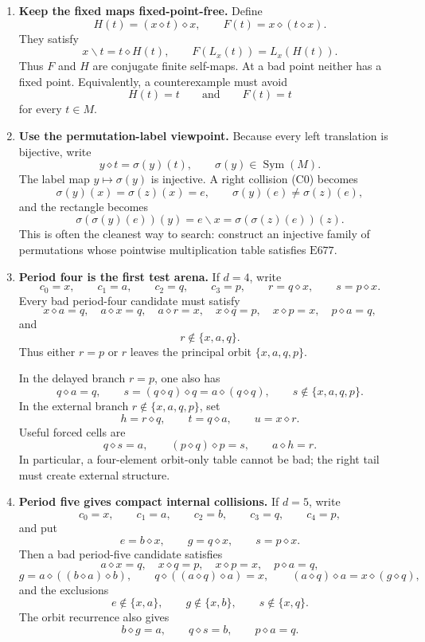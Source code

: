 \documentclass[12pt]{article}
\newcommand{\op}{\diamond}
\newcommand{\E}[1]{\mathrm{E#1}}
\theoremstyle{definition}
\begin{document}
\begin{enumerate}[label=\textbf{\arabic*.}]
\item \textbf{Keep the fixed maps fixed-point-free.}
Define
\[
H(t)=(x\op t)\op x,
\qquad
F(t)=x\op(t\op x).
\]
They satisfy
\[
x\backslash t=t\op H(t),
\qquad
F(L_x(t))=L_x(H(t)). \tag{F}
\]
Thus $F$ and $H$ are conjugate finite self-maps.  At a bad point neither has a fixed
point.  Equivalently, a counterexample must avoid
\[
H(t)=t
\qquad\text{and}\qquad
F(t)=t
\]
for every $t\in M$.

\item \textbf{Use the permutation-label viewpoint.}
Because every left translation is bijective, write
\[
y\op t=\sigma(y)(t),
\qquad
\sigma(y)\in\operatorname{Sym}(M).
\]
The label map $y\mapsto\sigma(y)$ is injective.  A right collision (C0) becomes
\[
\sigma(y)(x)=\sigma(z)(x)=e,
\qquad
\sigma(y)(e)\ne\sigma(z)(e),
\]
and the rectangle becomes
\[
\sigma(\sigma(y)(e))(y)=e\backslash x
=\sigma(\sigma(z)(e))(z). \tag{P}
\]
This is often the cleanest way to search: construct an injective family of permutations
whose pointwise multiplication table satisfies $\E{677}$.

\item \textbf{Period four is the first test arena.}
If $d=4$, write
\[
c_0=x,
\qquad
c_1=a,
\qquad
c_2=q,
\qquad
c_3=p,
\qquad
r=q\op x,
\qquad
s=p\op x.
\]
Every bad period-four candidate must satisfy
\[
x\op a=q,
\quad
a\op x=q,
\quad
a\op r=x,
\quad
x\op q=p,
\quad
x\op p=x,
\quad
p\op a=q, \tag{P4}
\]
and
\[
r\notin\{x,a,q\}. \tag{P4a}
\]
Thus either $r=p$ or $r$ leaves the principal orbit $\{x,a,q,p\}$.

In the delayed branch $r=p$, one also has
\[
q\op a=q,
\qquad
s=(q\op q)\op q=a\op(q\op q),
\qquad
s\notin\{x,a,q,p\}. \tag{P4b}
\]
In the external branch $r\notin\{x,a,q,p\}$, set
\[
h=r\op q,
\qquad
t=q\op a,
\qquad
u=x\op r.
\]
Useful forced cells are
\[
q\op s=a,
\qquad
(p\op q)\op p=s,
\qquad
a\op h=r. \tag{P4c}
\]
In particular, a four-element orbit-only table cannot be bad; the right tail must create
external structure.

\item \textbf{Period five gives compact internal collisions.}
If $d=5$, write
\[
c_0=x,
\qquad
c_1=a,
\qquad
c_2=b,
\qquad
c_3=q,
\qquad
c_4=p,
\]
and put
\[
e=b\op x,
\qquad
g=q\op x,
\qquad
s=p\op x.
\]
Then a bad period-five candidate satisfies
\[
a\op x=q,
\quad
x\op q=p,
\quad
x\op p=x,
\quad
p\op a=q, \tag{P5}
\]
\[
g=a\op((b\op a)\op b),
\qquad
q\op((a\op q)\op a)=x,
\qquad
(a\op q)\op a=x\op(g\op q), \tag{P5a}
\]
and the exclusions
\[
e\notin\{x,a\},
\qquad
g\notin\{x,b\},
\qquad
s\notin\{x,q\}. \tag{P5b}
\]
The orbit recurrence also gives
\[
b\op g=a,
\qquad
q\op s=b,
\qquad
p\op a=q. \tag{P5c}
\]


\end{enumerate}
\end{document}
